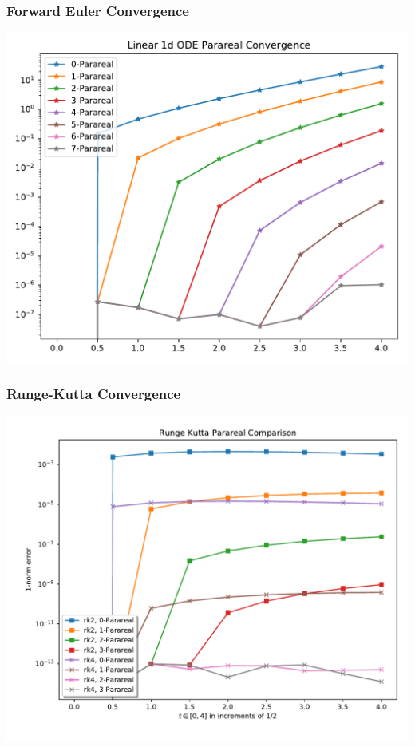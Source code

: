 \documentclass[pdf,12pt]{beamer}
\begin{document}
\begin{frame}
  \frametitle{Forward Euler Convergence}
  \begin{center}
    \includegraphics[width=.9\textwidth]{./resources/converge_fwerrs}
  \end{center}
\end{frame}
\begin{frame}
  \frametitle{Runge-Kutta Convergence}
  \begin{center}
    \includegraphics[width=.9\textwidth]{./resources/runge_kutta_parareal}
  \end{center}
\end{frame}
\end{document}
